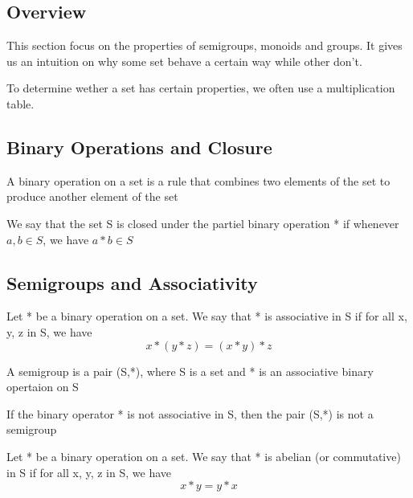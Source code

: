 \documentclass{article}
\begin{document}
\subsection{Overview}

This section focus on the properties of semigroups, monoids and groups. It gives
us an intuition on why some set behave a certain way while other don't.

To determine wether a set has certain properties, we often use a multiplication
table.

\subsection{Binary Operations and Closure}

\begin{definition}
    A binary operation on a set is a rule that combines two elements of the set to
    produce another element of the set
\end{definition}

\begin{definition}[Closed]
    We say that the set S is closed under the partiel binary operation * if
    whenever \(a,b \in S\), we have \(a * b \in S \)
\end{definition}

\subsection{Semigroups and Associativity}

\begin{definition}[Associativity]
    Let * be a binary operation on a set. We say that * is associative in S if
    for all x, y, z in S, we have
    $$ x * (y * z) = (x * y) * z $$
\end{definition}


\begin{definition}[Semigroup]
    A semigroup is a pair (S,*), where S is a set and * is an associative binary
    opertaion on S
\end{definition}

\begin{corollary}
    If the binary operator * is not associative in S, then the pair (S,*) is not
    a semigroup
\end{corollary}

\begin{definition}
    Let * be a binary operation on a set. We say that * is abelian (or commutative)
    in S if for all x, y, z in S, we have
    $$ x * y = y * x $$
\end{definition}
\end{document}
